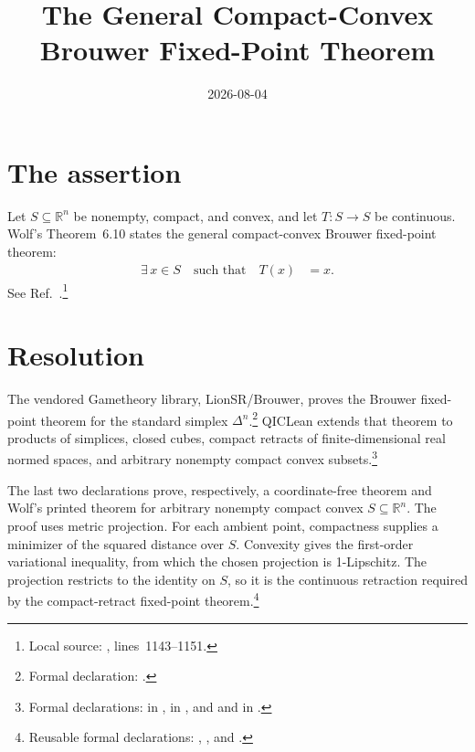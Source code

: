 \documentclass{article}
\title{The General Compact-Convex Brouwer Fixed-Point Theorem}
\author{}
\date{2026-08-04}
\begin{document}
\maketitle
{}

\section{The assertion}

Let $S\subseteq\mathbb R^n$ be nonempty, compact, and convex, and let
$T:S\to S$ be continuous. Wolf's Theorem~6.10 states the general
compact-convex Brouwer fixed-point theorem:
\begin{align}
    \exists\,x\in S
        \quad\text{such that}\quad
    T(x)
        &=x.
    \label{eq:wolf_brouwer_general_compact_convex_fixed_point}
\end{align}
See Ref.~\cite[Theorem~6.10]{Wolf2012Quantum}.\footnote{Local source:
,
lines~1143--1151.}

\section{Resolution}

The vendored Gametheory library, LionSR/Brouwer, proves the Brouwer fixed-point
theorem for the standard simplex $\Delta^n$.\footnote{Formal declaration:
.}
QICLean extends that theorem to products of simplices, closed cubes, compact
retracts of finite-dimensional real normed spaces, and arbitrary nonempty
compact convex subsets.\footnote{Formal declarations:
 in
,
 in
, and
 and
 in
.}

The last two declarations prove, respectively, a coordinate-free theorem and
Wolf's printed theorem for arbitrary nonempty compact convex
$S\subseteq\mathbb R^n$. The proof uses metric projection. For each ambient
point, compactness supplies a minimizer of the squared distance over $S$.
Convexity gives the first-order variational inequality, from which the chosen
projection is 1-Lipschitz. The projection restricts to the identity on $S$, so
it is the continuous retraction required by the compact-retract fixed-point
theorem.\footnote{Reusable formal declarations:
,
, and
.}
\end{document}

